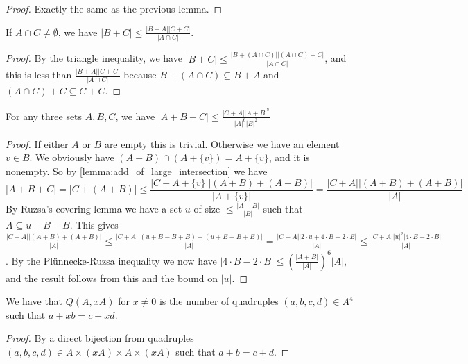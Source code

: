 \begin{proof}
    \leanok
    Exactly the same as the previous lemma.
\end{proof}

\begin{lemma}
    \label{add_of_large_intersection}
    \leanok
    If $A \cap C \neq \emptyset$, we have $|B+C| \leq \frac{|B+A| |C+C|}{|A \cap C|}$.
\end{lemma}

\begin{proof}
    \leanok
    By the triangle inequality, we have $|B+C| \leq \frac{|B + (A \cap C)| |(A \cap C) + C|}{|A \cap C|}$,
    and this is less than $\frac{|B+A| |C+C|}{|A \cap C|}$ because
    $B + (A \cap C)\subseteq B+A$ and $(A \cap C) + C \subseteq C + C$.
\end{proof}

\begin{lemma}
    \label{triple_add}
    \leanok
    For any three sets $A, B, C$, we have $|A+B+C| \leq \frac{|C+A| |A+B|^8}{|A|^6 |B|^2}$
\end{lemma}

\begin{proof}
    \leanok
    If either $A$ or $B$ are empty this is trivial.
    Otherwise we have an element $v \in B$. We obviously have $(A + B) \cap (A + \{v\}) = A + \{v\}$, and
    it is nonempty. So by \ref{lemma:add_of_large_intersection} we have
    $$
    |A+B+C| = |C + (A+B)| \leq \frac{|C + A + \{v\}| |(A+B) + (A+B)|}{|A + \{v\}|} = 
    \frac{|C + A| |(A+B) + (A+B)|}{|A|}
    $$
    By Ruzsa's covering lemma we have a set $u$ of size $\leq \frac{|A+B|}{|B|}$ such that $A \subseteq u + B - B$.
    This gives $\frac{|C + A| |(A+B) + (A+B)|}{|A|} \leq \frac{|C + A| |(u+B-B+B) + (u+B-B+B)|}{|A|} =
    \frac{|C + A| |2 \cdot u + 4 \cdot B - 2 \cdot B|}{|A|} \leq \frac{|C + A| |u|^2 |4 \cdot B - 2 \cdot B|}{|A|}$.
    By the Plünnecke-Ruzsa inequality we now have $|4 \cdot B - 2 \cdot B| \leq (\frac{|A+B|}{|A|})^6 |A|$,
    and the result follows from this and the bound on $|u|$.
\end{proof}

\begin{lemma}
    \label{additive_mul_eq}
    \leanok
    We have that $Q(A, x A)$ for $x \neq 0$ is the number of quadruples $(a, b, c, d) \in A^4$ such that $a + x b = c + x d$.
\end{lemma}

\begin{proof}
    \leanok
    By a direct bijection from quadruples $(a, b, c, d) \in A \times (xA) \times A \times (xA)$ such that $a + b = c + d$.
\end{proof}
